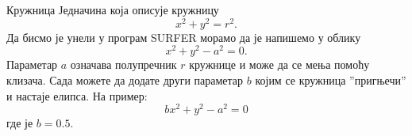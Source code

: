 \begin{surferPage}{Кружница}
Једначина која описује кружницу 
\[x^2+y^2=r^2.\]
Да бисмо је унели у програм SURFER морамо да је напишемо у облику
\[x^2+y^2-a^2=0.\]
Параметар $a$ означава полупречник $r$ кружнице и може да се мења помоћу клизача. Сада можете да додате други параметар $b$ којим се кружница ''пригњечи'' и настаје елипса. На пример:
\[bx^2+y^2-a^2=0\] где је $b=0.5$.
\end{surferPage}
